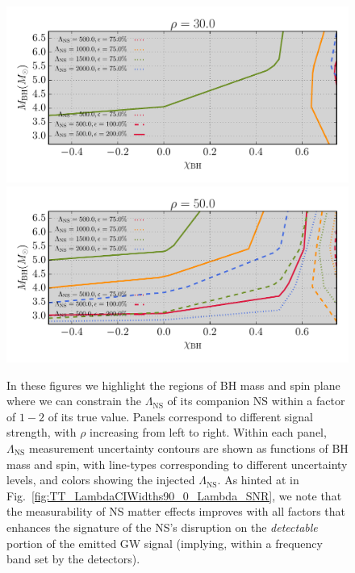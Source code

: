 \documentclass[aps,prd,amsmath,floats,floatfix, twocolumn,
superscriptaddress,nofootinbib,showpacs]{revtex4-1}
\newcommand{\lambdans}{\Lambda_\mathrm{NS}}
\begin{document}
%
\begin{figure}
\centering    
\includegraphics[width=1.025\columnwidth]{plots/TTLambdaErrorCurves_BHspin_BHmass_SNR30_CI90_0.pdf}
\includegraphics[width=1.025\columnwidth]{plots/TTLambdaErrorCurves_BHspin_BHmass_SNR50_CI90_0.pdf}\\
\caption{In these figures we highlight the regions of BH mass and spin plane where we can 
constrain the $\lambdans$ of its companion NS within a factor of $1-2$ of its true value.
Panels correspond to different signal strength, with $\rho$ increasing from left to right.
Within each panel, $\lambdans$ measurement uncertainty contours are shown as functions of BH 
mass and spin, with line-types corresponding to different uncertainty levels, and
colors showing the injected $\lambdans$.
As hinted at in Fig.~\ref{fig:TT_LambdaCIWidths90_0_Lambda_SNR}, we note that the measurability
of NS matter
effects improves with all factors that enhances the signature of the NS's disruption on
the \textit{detectable} portion of the emitted GW signal (implying, within a frequency band
set by the detectors).
}
\label{fig:TT_LambdaErrorCurves_BHspin_BHmass_CI90_0}
\end{figure}
\end{document}
